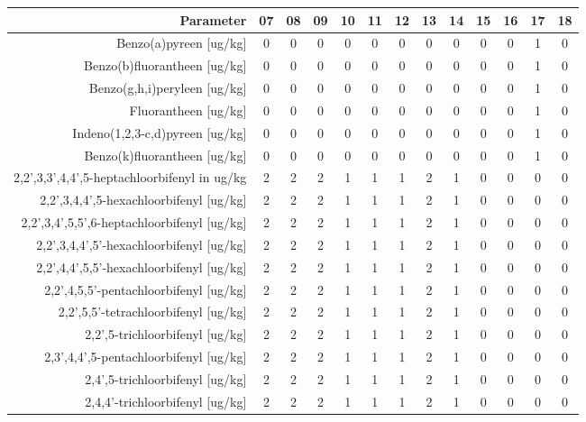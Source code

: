 \begin{tabular}{ r |c | c | c | c | c |c | c | c | c | c | c | c } 
\rowcolor[HTML]{EFEFEF}  
 Parameter & 07 & 08 & 09 & 10 & 11 & 12 & 13 & 14 & 15 & 16 & 17 & 18 \\    \hline     
Benzo(a)pyreen [ug/kg] &0 & 0 & 0 & 0 & 0 & 0 & 0 & 0 & 0 & 0 & 1 & 0 \\
Benzo(b)fluorantheen [ug/kg] &0 & 0 & 0 & 0 & 0 & 0 & 0 & 0 & 0 & 0 & 1 & 0 \\
Benzo(g,h,i)peryleen [ug/kg] &0 & 0 & 0 & 0 & 0 & 0 & 0 & 0 & 0 & 0 & 1 & 0 \\
Fluorantheen [ug/kg] &0 & 0 & 0 & 0 & 0 & 0 & 0 & 0 & 0 & 0 & 1 & 0 \\
Indeno(1,2,3-c,d)pyreen [ug/kg] &0 & 0 & 0 & 0 & 0 & 0 & 0 & 0 & 0 & 0 & 1 & 0 \\
Benzo(k)fluorantheen [ug/kg] &0 & 0 & 0 & 0 & 0 & 0 & 0 & 0 & 0 & 0 & 1 & 0 \\
2,2',3,3',4,4',5-heptachloorbifenyl in ug/kg &2 & 2 & 2 & 1 & 1 & 1 & 2 & 1 & 0 & 0 & 0 & 0 \\
2,2',3,4,4',5-hexachloorbifenyl [ug/kg] &2 & 2 & 2 & 1 & 1 & 1 & 2 & 1 & 0 & 0 & 0 & 0 \\
2,2',3,4',5,5',6-heptachloorbifenyl [ug/kg] &2 & 2 & 2 & 1 & 1 & 1 & 2 & 1 & 0 & 0 & 0 & 0 \\
2,2',3,4,4',5'-hexachloorbifenyl [ug/kg] &2 & 2 & 2 & 1 & 1 & 1 & 2 & 1 & 0 & 0 & 0 & 0 \\
2,2',4,4',5,5'-hexachloorbifenyl [ug/kg] &2 & 2 & 2 & 1 & 1 & 1 & 2 & 1 & 0 & 0 & 0 & 0 \\
2,2',4,5,5'-pentachloorbifenyl [ug/kg] &2 & 2 & 2 & 1 & 1 & 1 & 2 & 1 & 0 & 0 & 0 & 0 \\
2,2',5,5'-tetrachloorbifenyl [ug/kg] &2 & 2 & 2 & 1 & 1 & 1 & 2 & 1 & 0 & 0 & 0 & 0 \\
2,2',5-trichloorbifenyl [ug/kg] &2 & 2 & 2 & 1 & 1 & 1 & 2 & 1 & 0 & 0 & 0 & 0 \\
2,3',4,4',5-pentachloorbifenyl [ug/kg] &2 & 2 & 2 & 1 & 1 & 1 & 2 & 1 & 0 & 0 & 0 & 0 \\
2,4',5-trichloorbifenyl [ug/kg] &2 & 2 & 2 & 1 & 1 & 1 & 2 & 1 & 0 & 0 & 0 & 0 \\
2,4,4'-trichloorbifenyl [ug/kg] &2 & 2 & 2 & 1 & 1 & 1 & 2 & 1 & 0 & 0 & 0 & 0 \\
\end{tabular}    
